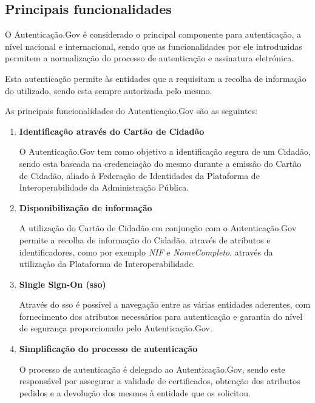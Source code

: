\cleardoublepage
\subsection{Principais funcionalidades} \label{authGovFuncionalidades}

O Autenticação.Gov é considerado o principal componente para autenticação, a nível nacional e internacional, sendo que as funcionalidades por ele introduzidas permitem a normalização do processo de autenticação e assinatura eletrónica.

Esta autenticação permite às entidades que a requisitam a recolha de informação do utilizado, sendo esta sempre autorizada pelo mesmo.

As principais funcionalidades do Autenticação.Gov são as seguintes:

\begin{enumerate}
    \item \textbf{Identificação através do Cartão de Cidadão}
    
    O Autenticação.Gov tem como objetivo a identificação segura de um Cidadão, sendo esta baseada na credenciação do mesmo durante a emissão do Cartão de Cidadão, aliado à Federação de Identidades da Plataforma de Interoperabilidade da Administração Pública.
    
    \item \textbf{Disponibilização de informação}
    
    A utilização do Cartão de Cidadão em conjunção com o Autenticação.Gov permite a recolha de informação do Cidadão, através de atributos e identificadores, como por exemplo \textit{NIF} e \textit{NomeCompleto}, através da utilização da Plataforma de Interoperabilidade.
    
    \item \textbf{Single Sign-On (\gls{sso})}
    
    Através do \gls{sso} é possível a navegação entre as várias entidades aderentes, com fornecimento dos atributos necessários para autenticação e garantia do nível de segurança proporcionado pelo Autenticação.Gov.
    
    \item \textbf{Simplificação do processo de autenticação}
    
    O processo de autenticação é delegado ao Autenticação.Gov, sendo este responsável por assegurar a validade de certificados, obtenção dos atributos pedidos e a devolução dos mesmos à entidade que os solicitou.
    

\end{enumerate}
